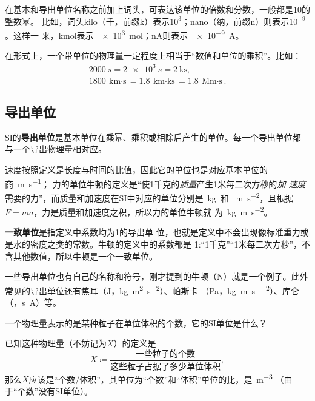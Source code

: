 在基本和导出单位名称之前加上词头，可表达该单位的倍数和分数，一般都是$10$的整数幂。
比如，词头kilo（千，前缀k）表示$10^3$；nano（纳，前缀n）则表示$10^{-9}$。这样一
来，\unit{\kilo\mol}表示~\qty{e3}{\mol}；\unit{\nano\A}则表示~\qty{e-9}{\A}。

在形式上，一个带单位的物理量一定程度上相当于“数值和单位的乘积”。比如：
\begin{gather*}
    \qty{2000}{s} = \qty{2e3}{s} = \qty{2}{\kilo\s},\\
    \qty{1800}{\km\cdot\s} = \qty{1.8}{\km\cdot\kilo\s} = \qty{1.8}
    {\mega\metre\cdot\s}
.\end{gather*} 

\subsection{导出单位}

SI的\textbf{导出单位}是基本单位在乘幂、乘积或相除后产生的单位。每一个导出单位都
与一个导出物理量相对应。

速度按照定义是长度与时间的比值，因此它的单位也是对应基本单位的商~\unit{\m\per\s}；
力的单位牛顿的定义是“使1千克的\emph{质量}产生1米每二次方秒的\emph{加
速度}需要的力”，而质量和加速度在SI中对应的单位分别是~\unit{\kg}~和%
~\unit{\m\per\square\s}，且根据$F=ma$，力是质量和加速度之积，所以力的单位牛顿就
为~\unit{\kg\m\per\square\s}。

\textbf{一致单位}是指定义中系数均为1的导出单
位，也就是定义中不会出现像标准重力或是水的密度之类的常数。牛顿的定义中的系数都是%
1:“1千克”“1米每二次方秒”，不含其他数值，所以牛顿是一个一致单位。

一些导出单位也有自己的名称和符号，刚才提到的牛顿（\unit{\N}）就是一个例子。此外
常见的导出单位还有焦耳（\unit{\J}，\unit{\kg\square\m\per\square\s}）、帕斯卡
（\unit{\Pa}，\unit{\kg\per\m\per\square\s}）、库仑（\unit{\C}，\unit{\s\A}）等。

\begin{rawexp}\label{exp:particle_density_unit}
    一个物理量表示的是某种粒子在单位体积的个数，它的SI单位是什么？
\end{rawexp}

\begin{rawsol}
    已知这种物理量（不妨记为$X$）的定义是
    \[
        X \coloneq \frac{\text{一些粒子的个数}}{\text{这些粒子占据了多少单位体积}}
    ,\]
    那么$X$应该是“个数/体积”，其单位为“个数”和“体积”单位的比，是~\unit{\m^{-3}}
    （由于“个数”没有SI单位）。
\end{rawsol}

